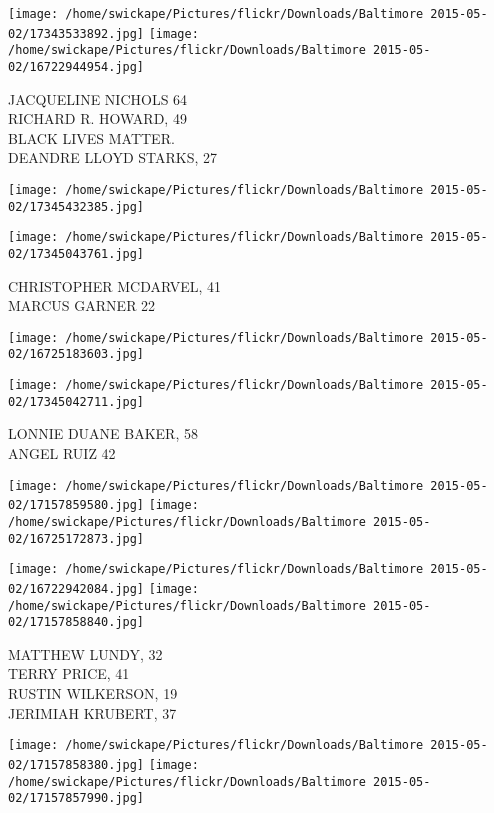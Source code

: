 \documentclass[10pt,letterpaper]{article}
\begin{document}
\texttt{[image: /home/swickape/Pictures/flickr/Downloads/Baltimore 2015-05-02/17343533892.jpg]}
\texttt{[image: /home/swickape/Pictures/flickr/Downloads/Baltimore 2015-05-02/16722944954.jpg]}

JACQUELINE NICHOLS 64\\
RICHARD R. HOWARD, 49\\
BLACK LIVES MATTER.\\
DEANDRE LLOYD STARKS, 27\\
\pagebreak

\texttt{[image: /home/swickape/Pictures/flickr/Downloads/Baltimore 2015-05-02/17345432385.jpg]}

\vspace{0.25in}
\texttt{[image: /home/swickape/Pictures/flickr/Downloads/Baltimore 2015-05-02/17345043761.jpg]}

CHRISTOPHER MCDARVEL, 41\\
MARCUS GARNER 22\\
\pagebreak

\texttt{[image: /home/swickape/Pictures/flickr/Downloads/Baltimore 2015-05-02/16725183603.jpg]}

\vspace{0.25in}
\texttt{[image: /home/swickape/Pictures/flickr/Downloads/Baltimore 2015-05-02/17345042711.jpg]}

LONNIE DUANE BAKER, 58\\
ANGEL RUIZ 42\\
\pagebreak

\texttt{[image: /home/swickape/Pictures/flickr/Downloads/Baltimore 2015-05-02/17157859580.jpg]}
\texttt{[image: /home/swickape/Pictures/flickr/Downloads/Baltimore 2015-05-02/16725172873.jpg]}

\texttt{[image: /home/swickape/Pictures/flickr/Downloads/Baltimore 2015-05-02/16722942084.jpg]}
\texttt{[image: /home/swickape/Pictures/flickr/Downloads/Baltimore 2015-05-02/17157858840.jpg]}

MATTHEW LUNDY, 32\\
TERRY PRICE, 41\\
RUSTIN WILKERSON, 19\\
JERIMIAH KRUBERT, 37\\
\pagebreak

\texttt{[image: /home/swickape/Pictures/flickr/Downloads/Baltimore 2015-05-02/17157858380.jpg]}
\texttt{[image: /home/swickape/Pictures/flickr/Downloads/Baltimore 2015-05-02/17157857990.jpg]}
\end{document}
